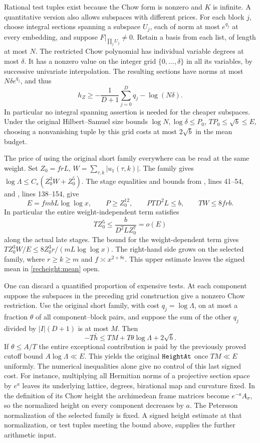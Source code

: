 Rational test tuples exist because the Chow form is nonzero and
\(K\) is infinite. A quantitative version also allows subspaces
with different prices. For each block \(j\), choose integral
sections spanning a subspace \(U_j\), each of norm at most
\(e^{q_j}\) at every embedding, and suppose
\(F|_{\prod_j U_j}\ne0\). Retain a basis from each list, of length
at most \(N\). The restricted Chow polynomial has individual
variable degrees at most \(\delta\). It has a nonzero value on the
integer grid \(\{0,\ldots,\delta\}\) in all its variables, by
successive univariate interpolation. The resulting sections have
norms at most \(N\delta e^{q_j}\), and thus
\[
       h_Z\ge-\frac1{D+1}\sum_{j=0}^D q_j-\log(N\delta).
\]
In particular no integral spanning assertion is needed for the
cheaper subspaces. Under the original Hilbert--Samuel size bounds
\(\log N,\log\delta\le P_0\), \(TP_0\le\sqrt b\le E\), choosing a
nonvanishing tuple by this grid costs at most \(2\sqrt b\) in the
mean budget.

The price of using the original short family everywhere can be read
at the same weight. Set \(Z_0=frL\),
\(W=\sum_{\tau,k}|u_1(\tau,k)|\). The family gives
\(\log\Lambda\le C_s(Z_0^3W+Z_0^5)\).
The stage equalities and bounds from , lines
41--54, and , lines 138--154, give
\[
    E=fmbL\log\log x,\qquad P\ge Z_0^{12},\qquad
    PTD^2L\le b,\qquad TW\le 8frb .
\]
In particular the entire weight-independent term satisfies
\[
       TZ_0^5\le\frac{b}{D^2L Z_0^7}=o(E)
\]
along the actual late stages. The bound for the weight-dependent
term gives \(TZ_0^3W/E\le 8Z_0^3r/(mL\log\log x)\). The right-hand
side grows on the selected family, where \(r\ge k\ge m\) and
\(f\asymp x^{2+8\epsilon}\). This upper estimate leaves the signed
mean in \eqref{recheight:mean} open.

One can discard a quantified proportion of expensive tests. At each
component suppose the subspaces in the preceding grid construction
give a nonzero Chow restriction. Use the original short family,
with cost \(q_j=\log\Lambda\), on at most a fraction \(\theta\) of
all component--block pairs, and suppose the sum of the other \(q_j\)
divided by \(|I|(D+1)\) is at most \(M\). Then
\[
       -T\bar h\le TM+T\theta\log\Lambda+2\sqrt b .
\]
If \(\theta\le A/T\) the entire exceptional contribution is paid by
the previously proved cutoff bound \(A\log\Lambda\ll E\). This
yields the original \(\texttt{HeightAt}\) once \(TM\ll E\) uniformly.
The numerical inequalities alone give no control of this last
signed cost. For instance, multiplying all Hermitian norms of a
projective section space by \(e^a\) leaves its underlying lattice,
degrees, birational map and curvature fixed. In the definition of its
Chow height the archimedean frame matrices become \(e^{-a}A_\sigma\),
so the normalized height on every component decreases by \(a\).
The Petersson normalization of the selected family is fixed. A
signed height estimate at that normalization, or test tuples meeting
the bound above, supplies the further arithmetic input.

